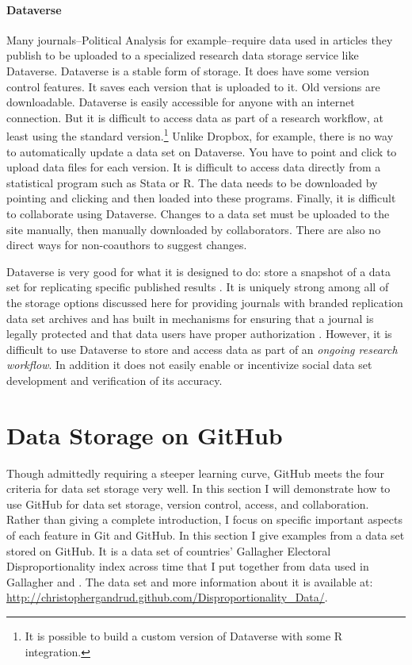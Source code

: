 \documentclass[twocolumn]{article}\usepackage{graphicx, color}
\begin{document}
\paragraph{Dataverse}

Many journals--Political Analysis for example--require data used in articles they publish to be uploaded to a specialized research data storage service like Dataverse. Dataverse is a stable form of storage. It does have some version control features. It saves each version that is uploaded to it. Old versions are downloadable. Dataverse is easily accessible for anyone with an internet connection. But it is difficult to access data as part of a research workflow, at least using the standard version.\footnote{It is possible to build a custom version of Dataverse with some R integration.} Unlike Dropbox, for example, there is no way to automatically update a data set on Dataverse. You have to point and click to upload data files for each version. It is difficult to access data directly from a statistical program such as Stata or R. The data needs to be downloaded by pointing and clicking and then loaded into these programs. Finally, it is difficult to collaborate using Dataverse. Changes to a data set must be uploaded to the site manually, then manually downloaded by collaborators. There are also no direct ways for non-coauthors to suggest changes.

Dataverse is very good for what it is designed to do: store a snapshot of a data set for replicating specific published results \citep{King2007}. It is uniquely strong among all of the storage options discussed here for providing journals with branded replication data set archives and has built in mechanisms for ensuring that a journal is legally protected and that data users have proper authorization \citep[177-179]{King2007}. However, it is difficult to use Dataverse to store and access data as part of an \emph{ongoing research workflow}. In addition it does not easily enable or incentivize social data set development and verification of its accuracy. 

\section{Data Storage on GitHub}

Though admittedly requiring a steeper learning curve, GitHub meets the four criteria for data set storage very well. In this section I will demonstrate how to use GitHub for data set storage, version control, access, and collaboration. Rather than giving a complete introduction, I focus on specific important aspects of each feature in Git and GitHub. In this section I give examples from a data set stored on GitHub. It is a data set of countries' Gallagher Electoral Disproportionality index across time that I put together from data used in Gallagher \citeyearpar[updated through 2011]{Gallagher1991} and \cite{Carey2011}. The data set and more information about it is available at: \url{http://christophergandrud.github.com/Disproportionality_Data/}.
\end{document}
